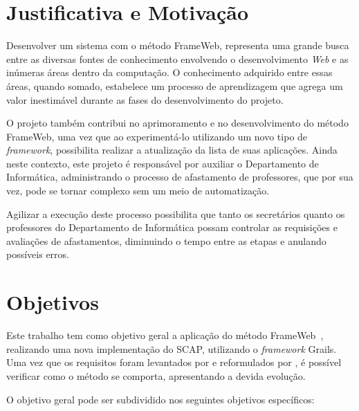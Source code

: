

\section{Justificativa e Motivação}
\label{sec-intro-justificativa-motivacao}

Desenvolver um sistema com o método FrameWeb, representa uma grande busca entre as diversas fontes de conhecimento envolvendo o desenvolvimento \textit{Web} e as inúmeras áreas dentro da computação. O conhecimento adquirido entre essas áreas, quando somado, estabelece um processo de aprendizagem que agrega um valor inestimável durante as fases do desenvolvimento do projeto.

O projeto também contribui no aprimoramento e no desenvolvimento do método FrameWeb, uma vez que ao experimentá-lo utilizando um novo tipo de \textit{framework}, possibilita realizar a atualização da lista de suas aplicações. Ainda neste contexto, este projeto é responsável por auxiliar o Departamento de Informática, administrando o processo de afastamento de professores, que por sua vez, pode se tornar complexo sem um meio de automatização.

Agilizar a execução deste processo possibilita que tanto os secretários quanto os professores do Departamento de Informática possam controlar as requisições e avaliações de afastamentos, diminuindo o tempo entre as etapas e anulando possíveis erros.               



\section{Objetivos}
\label{sec-intro-objetivos}

Este trabalho tem como objetivo geral a aplicação do método FrameWeb~\cite{souza:masterthesis07,souza-celebratingfalbo20}, realizando uma nova implementação do SCAP, utilizando o \textit{framework} Grails. Uma vez que os requisitos foram levantados por  e reformulados por , é possível verificar como o método se comporta, apresentando a devida evolução.

O objetivo geral pode ser subdividido nos seguintes objetivos específicos:

